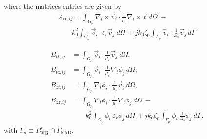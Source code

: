 \documentclass[AMA,STIX2COL]{WileyNJD-v2}
\begin{document}
%
\noindent where the matrices entries are given by
\begin{multline}
A_{tt,ij} = \int_{\Omega_p} \nabla_t \times \vec{v}_i  \cdot \frac{1}{\mu_r} \nabla_t \times \vec{v} \ d\Omega \ - \\
  \qquad k_0^2 \int_{\Omega_p} \vec{v}_i  \cdot \varepsilon_r \vec{v}_j \ d\Omega \ +  
j k_0 \zeta_0
\int_{\Gamma_p} \vec{v}_i  \cdot \frac{1}{Z_s} \vec{v}_j \ d\Gamma
\end{multline}

\begin{equation}
\begin{aligned}
B_{tt,ij} &=  \int_{\Omega_p} \vec{v}_i  \cdot  \frac{1}{\mu_r}\vec{v}_j \ d\Omega, \\
B_{tz,ij} &=  \int_{\Omega_p} \vec{v}_i  \cdot  \frac{1}{\mu_r}\nabla_t \phi_j \ d\Omega, \\
B_{zt,ij} &=  \int_{\Omega_p} \nabla_t \phi_i  \cdot  \frac{1}{\mu_r}\vec{v}_j \ d\Omega, \\
B_{zz,ij} &=  \int_{\Omega_p} \nabla_t \phi_i  \cdot  \frac{1}{\mu_r}\nabla_t \phi_j \ d\Omega \ - \\
& \qquad k_0^2  \int_{\Omega_p} \phi_i \ \varepsilon_r \phi_j \ d\Omega \ +  j k_0 \zeta_0 \int_{\Gamma_p} \phi_i \ \frac{1}{Z_s} \phi_j \ d\Gamma.
\end{aligned}
\end{equation}
\noindent with $\Gamma_p \equiv {\Gamma_\text{WG}^{p} \cap \Gamma_{\text{RAD}}}$.
%
\end{document}
